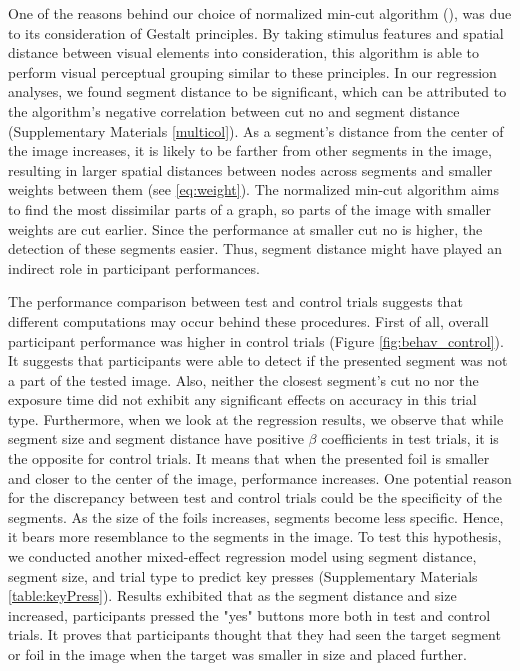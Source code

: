 \documentclass{article}
\begin{document}
One of the reasons behind our choice of normalized min-cut algorithm (\cite{RN165}), was due to its consideration of Gestalt principles. By taking stimulus features and spatial distance between visual elements into consideration, this algorithm is able to perform visual perceptual grouping similar to these principles. In our regression analyses, we found segment distance to be significant, which can be attributed to the algorithm's negative correlation between cut no and segment distance (Supplementary Materials \ref{multicol}). As a segment's distance from the center of the image increases, it is likely to be farther from other segments in the image, resulting in larger spatial distances between nodes across segments and smaller weights between them (see \ref{eq:weight}). The normalized min-cut algorithm aims to find the most dissimilar parts of a graph, so parts of the image with smaller weights are cut earlier. Since the performance at smaller cut no is higher, the detection of these segments easier. Thus, segment distance might have played an indirect role in participant performances.

The performance comparison between test and control trials suggests that different computations may occur behind these procedures. First of all, overall participant performance was higher in control trials (Figure \ref{fig:behav_control}). It suggests that participants were able to detect if the presented segment was not a part of the tested image. Also, neither the closest segment's cut no nor the exposure time did not exhibit any significant effects on accuracy in this trial type. Furthermore, when we look at the regression results, we observe that while segment size and segment distance have positive $\beta$ coefficients in test trials, it is the opposite for control trials. It means that when the presented foil is smaller and closer to the center of the image, performance increases. One potential reason for the discrepancy between test and control trials could be the specificity of the segments. As the size of the foils increases, segments become less specific. Hence, it bears more resemblance to the segments in the image. To test this hypothesis, we conducted another mixed-effect regression model using segment distance, segment size, and trial type to predict key presses (Supplementary Materials \ref{table:keyPress}). Results exhibited that as the segment distance and size increased, participants pressed the "yes" buttons more both in test and control trials. It proves that participants thought that they had seen the target segment or foil in the image when the target was smaller in size and placed further.
\end{document}
